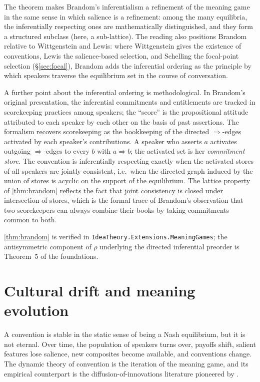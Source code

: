 The theorem makes Brandom's inferentialism a refinement of the meaning
game in the same sense in which salience is a refinement: among the
many equilibria, the inferentially respecting ones are
mathematically distinguished, and they form a structured subclass
(here, a sub-lattice). The reading also positions Brandom relative to
Wittgenstein and Lewis: where Wittgenstein gives the existence of
conventions, Lewis the salience-based selection, and Schelling the
focal-point selection (\S\ref{sec:focal}), Brandom adds the inferential
ordering as the principle by which speakers traverse the
equilibrium set in the course of conversation.

A further point about the inferential ordering is methodological. In
Brandom's original presentation, the inferential commitments and
entitlements are tracked in scorekeeping practices among speakers;
the ``score'' is the propositional attitude attributed to each
speaker by each other on the basis of past assertions. The formalism
recovers scorekeeping as the bookkeeping of the directed
$\Rightarrow$-edges activated by each speaker's contributions. A
speaker who asserts $a$ activates outgoing $\Rightarrow$-edges to
every $b$ with $a\Rightarrow b$; the activated set is her
\emph{commitment store}. The convention is inferentially respecting
exactly when the activated stores of all speakers are jointly
consistent, i.e.\ when the directed graph induced by the union of
stores is acyclic on the support of the equilibrium. The lattice
property of \cref{thm:brandom} reflects the fact that joint
consistency is closed under intersection of stores, which is the
formal trace of Brandom's observation that two scorekeepers can
always combine their books by taking commitments common to both.

\formalstatus \cref{thm:brandom} is verified in
\texttt{IdeaTheory.Extensions.MeaningGames}; the antisymmetric component
of $\rho$ underlying the directed inferential preorder is Theorem~5 of
the foundations.

\section{Cultural drift and meaning evolution}\label{sec:drift}

A convention is stable in the static sense of being a Nash equilibrium,
but it is not eternal. Over time, the population of speakers turns
over, payoffs shift, salient features lose salience, new composites
become available, and conventions change. The dynamic theory of
convention is the iteration of the meaning game, and its empirical
counterpart is the diffusion-of-innovations literature pioneered by
\cite{Rogers2003}.

